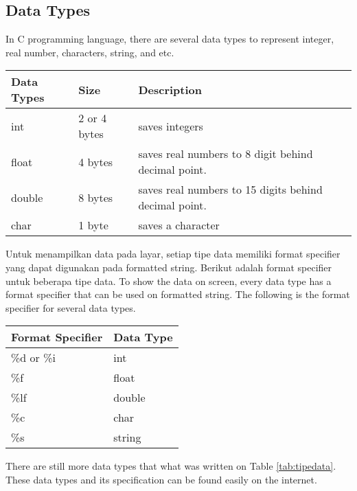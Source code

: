 \subsection{Data Types}
In C programming language, there are several data types to represent integer, real number, characters, string, and etc.
\begin{center}
	\begin{tabular}{|l|l|l|}
		\hline
		Data Types & Size         & Description                                         \\ \hline
		int       & 2 or 4 bytes & saves integers                        \\ \hline
		float     & 4 bytes      & saves real numbers to 8 digit behind decimal point. \\ \hline
		double    & 8 bytes      & saves real numbers to 15 digits behind decimal point. \\ \hline
		char      & 1 byte       & saves a character                     \\ \hline
	\end{tabular}
\end{center}
Untuk menampilkan data pada layar, setiap tipe data memiliki format specifier yang dapat digunakan pada formatted string. Berikut adalah format specifier untuk beberapa tipe data.
To show the data on screen, every data type has a format specifier that can be used on formatted string. The following is the format specifier for several data types.
\begin{center}
	\begin{tabular}{|l|l|}
		\hline
		Format Specifier & Data Type   \\ \hline
		\%d or \%i       & int          \\ \hline
		\%f              & float        \\ \hline
		\%lf             & double       \\ \hline
		\%c              & char         \\ \hline
		\%s              & string \\ \hline
	\end{tabular}
\end{center}
There are still more data types that what was written on Table \ref{tab:tipedata}. These data types and its specification can be found easily on the internet.

